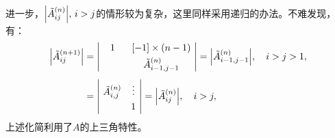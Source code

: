 \documentclass[preview,10pt,border=8pt]{standalone}
\begin{document}
	进一步，$\abs{\tilde{A}^{(n)}_{ij}},\,i>j$的情形较为复杂，这里同样采用递归的办法。不难发现，有：
	\begin{equation}
	\begin{aligned}
	\abs{\tilde{A}^{(n+1)}_{ij}}
	&= \left|\ 
	 	\begin{matrix}
			1 & [-1] \times (n-1)\ \\[.8ex]
			\qquad & \tilde{A}^{(n)}_{i-1,j-1}
	 	\end{matrix}\ \right|
	 = \abs{\tilde{A}^{(n)}_{i-1,j-1}},\quad
	 	i > j > 1,\\[1ex]
	&= \left|\ 
	 	\begin{matrix}
			\tilde{A}^{(n)}_{i,j} & \vdots \\[.8ex]
			& 1 
	 	\end{matrix}\ \right|
	 = \abs{\tilde{A}^{(n)}_{ij}},\quad
	 	i > j,\\
	\end{aligned}
	\end{equation}
	上述化简利用了$A$的上三角特性。
	
\end{document}
